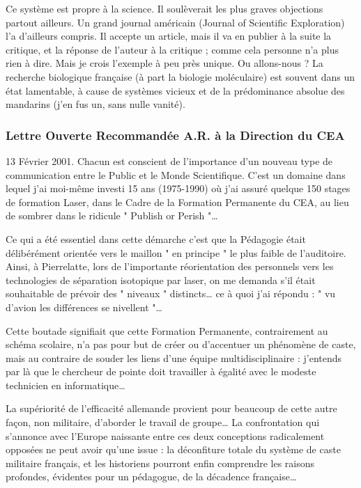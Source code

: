 \documentclass[a4paper,12pt]{article}
\begin{document}
Ce système est propre à la science. Il soulèverait les plus graves objections partout ailleurs. Un grand journal américain (Journal of Scientific Exploration) l’a d’ailleurs compris. Il accepte un article, mais il va en publier à la suite la critique, et la réponse de l’auteur à la critique ; comme cela personne n’a plus rien à dire. Mais je crois l’exemple à peu près unique.
Ou allons-nous ? La recherche biologique française (à part la biologie moléculaire) est souvent dans un état lamentable, à cause de systèmes vicieux et de la prédominance absolue des mandarins (j’en fus un, sans nulle vanité). 


\subsubsection{ Lettre Ouverte Recommandée A.R. à la Direction du CEA  }

13 Février 2001. Chacun est conscient de l’importance d’un nouveau type de communication entre le Public et le Monde Scientifique. C’est un domaine dans lequel j’ai moi-même investi 15 ans (1975-1990) où j’ai assuré quelque 150 stages de formation Laser, dans le Cadre de la Formation Permanente du CEA, au lieu de sombrer dans le ridicule " Publish or Perish "…

Ce qui a été essentiel dans cette démarche c’est que la Pédagogie était délibérément orientée vers le maillon " en principe " le plus faible de l’auditoire. Ainsi, à Pierrelatte, lors de l’importante réorientation des personnels vers les technologies de séparation isotopique par laser, on me demanda s’il était souhaitable de prévoir des " niveaux " distincts… ce à quoi j’ai répondu : " vu d’avion les différences se nivellent "… 


Cette boutade signifiait que cette Formation Permanente, contrairement au schéma scolaire, n’a pas pour but de créer ou d’accentuer un phénomène de caste, mais au contraire de souder les liens d’une équipe multidisciplinaire : j’entends par là que le chercheur de pointe doit travailler à égalité avec le modeste technicien en informatique… 


La supériorité de l’efficacité allemande provient pour beaucoup de cette autre façon, non militaire, d’aborder le travail de groupe… La confrontation qui s’annonce avec l’Europe naissante entre ces deux conceptions radicalement opposées ne peut avoir qu’une issue : la déconfiture totale du système de caste militaire français, et les historiens pourront enfin comprendre les raisons profondes, évidentes pour un pédagogue, de la décadence française…
\end{document}
